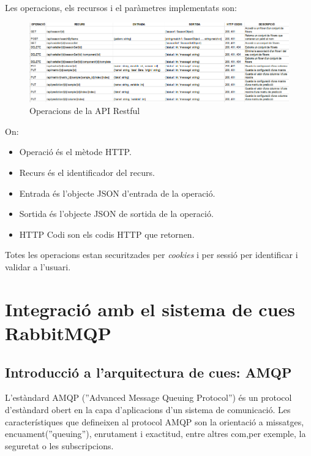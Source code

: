 Les operacions, els recursos i el paràmetres implementats son:\\
\begin{figure}[H]
  \includegraphics[scale=0.5]{img/implementation/apirestul.png}
  \caption{Operacions de la API Restful}
  \label{fig:apirestful}
\end{figure}
On:
\begin{itemize}
\item Operació \'{e}s el mètode HTTP.
\item Recurs \'{e}s el identificador del recurs.
\item Entrada \'{e}s l'objecte JSON d'entrada de la operació.
\item Sortida \'{e}s l'objecte JSON de sortida de la operació.
\item HTTP Codi son els codis HTTP que retornen.\cite{listhttpcodis}
\end{itemize}

Totes les operacions estan securitzades per \textit{cookies}\cite{cookies} i per sessió per identificar i validar a l'usuari.\cite{sessions}

\section{Integraci\'{o} amb el sistema de cues RabbitMQP}
\subsection{Introducci\'{o} a l'arquitectura de cues: AMQP}
\label{sec:queue_system_overview}
L'est\`{a}ndard AMQP (''Advanced Message Queuing Protocol'') \'{e}s un protocol d'est\`{a}ndard obert en la capa d'aplicacions d'un sistema de comunicació. Les característiques que defineixen al protocol AMQP son la orientació a missatges, encuament(''queuing''), enrutament i exactitud, entre altres com,per exemple, la seguretat o les subscripcions.\cite{amqp}\\


